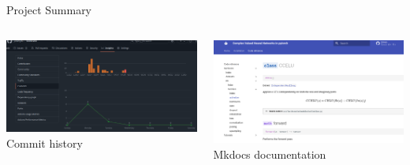 \documentclass[aspectratio=169,10pt]{beamer}
\begin{document}
\begin{frame}{Project Summary}
\begin{itemize}
\begin{columns}[T] %
\begin{column}{.3\textwidth}
\begin{center}
\includegraphics[width=\columnwidth]{images/commit_history.png}\\
Commit history
\end{center}
\end{column}%
\hfill%
\begin{column}{.3\textwidth}
\begin{center}
\includegraphics[width=\columnwidth]{images/documentation.png}\\
Mkdocs documentation
\end{center}
\end{column}%
\end{columns}

\end{itemize}

\end{frame}

\end{document}
